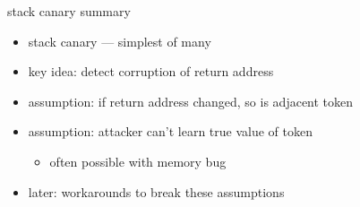 
\begin{frame}{stack canary summary}
    \begin{itemize}
    \item stack canary --- simplest of many 
    \item key idea: detect corruption of return address
    \item assumption: if return address changed, so is adjacent token
    \item assumption: attacker can't learn true value of token
        \begin{itemize}
        \item often possible with memory bug
        \end{itemize}
    \vspace{.5cm}
    \item later: workarounds to break these assumptions
    \end{itemize}
\end{frame}



